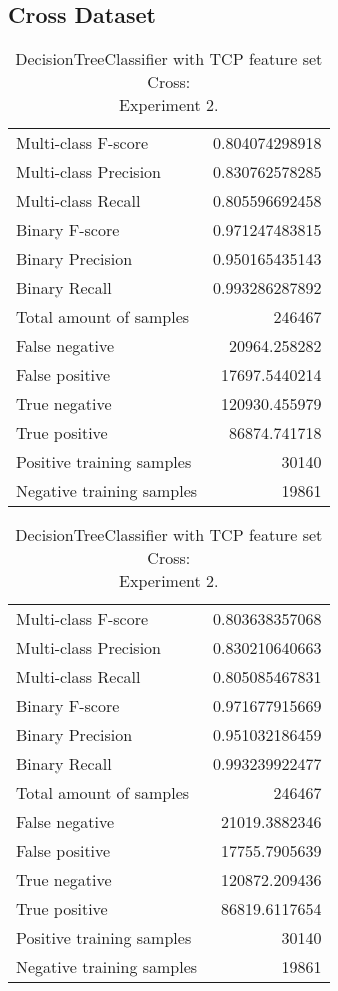 \newpage
\subsection{Cross Dataset}

\begin{table}[H]
\begin{minipage}{0.5\textwidth}
\caption{DecisionTreeClassifier with TCP feature set Cross: \\Experiment 1.}
\centering
\begin{tabular}{l r}
\toprule
Multi-class F-score & 0.804074298918 \\
Multi-class Precision & 0.830762578285 \\
Multi-class Recall & 0.805596692458 \\
\midrule
Binary F-score & 0.971247483815 \\
Binary Precision & 0.950165435143 \\
Binary Recall & 0.993286287892 \\
\midrule
Total amount of samples & 246467 \\
False negative & 20964.258282 \\
False positive & 17697.5440214 \\
True negative & 120930.455979 \\
True positive & 86874.741718 \\
\midrule
Positive training samples & 30140 \\
Negative training samples & 19861 \\
\bottomrule
\end{tabular}
\end{minipage}
\hfillx
\begin{minipage}{0.5\textwidth}
\caption{DecisionTreeClassifier with TCP feature set Cross: \\Experiment 2.}
\centering
\begin{tabular}{l r}
\toprule
Multi-class F-score & 0.803638357068 \\
Multi-class Precision & 0.830210640663 \\
Multi-class Recall & 0.805085467831 \\
\midrule
Binary F-score & 0.971677915669 \\
Binary Precision & 0.951032186459 \\
Binary Recall & 0.993239922477 \\
\midrule
Total amount of samples & 246467 \\
False negative & 21019.3882346 \\
False positive & 17755.7905639 \\
True negative & 120872.209436 \\
True positive & 86819.6117654 \\
\midrule
Positive training samples & 30140 \\
Negative training samples & 19861 \\
\bottomrule
\end{tabular}
\end{minipage}
\end{table}
